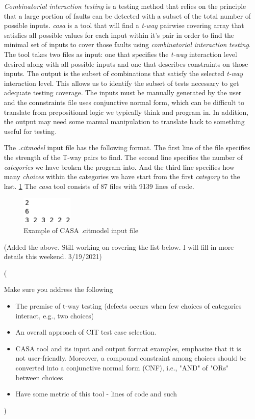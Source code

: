 \documentclass[a4full,12pt]{article}
\newcommand{\eas}[1]{{\color{blue}\sf ({#1})}}
\newcommand{\ag}[1]{{\color{red}\sf ({#1})}}
\begin{document}
\emph{Combinatorial interaction testing} is a testing method that relies on the principle
  that a large portion of faults can be detected with a subset of the total number of 
  possible inputs. \emph{casa} is a tool that will find a \emph{t-way} pairwise covering 
  array that satisfies all possible values for each input within it's pair in order to find
  the minimal set of inputs to cover those faults using \emph{combinatorial interaction
  testing}. The tool takes two files as input: one that specifies the \emph{t-way} interaction
  level desired along with all possible inputs and one that describes constraints on those
  inputs. The output is the subset of combinations that satisfy the selected \emph{t-way}
  interaction level. This allows us to identify the subset of tests necessary to get adequate
  testing coverage. The inputs must be manually generated by the user and the connstraints
  file uses conjunctive normal form, which can be difficult to translate from prepositional
  logic we typically think and program in. In addition, the output may need some manual
  manipulation to translate back to something useful for testing.
  
The \emph{.citmodel} input file has the following format. The first line of the file
  specifies the strength of the T-way pairs to find. The second line specifies the number
  of \emph{categories} we have broken the program into. And the third line specifies how
  many \emph{choices} within the categories we have start from the first \emph{category} to
  the last. \ref{fig:casa_citmodel_input}
The \emph{casa} tool consists of 87 files with 9139 lines of code.
  
\begin{figure}[htb]
\centering
\includegraphics[width=1in,keepaspectratio]{images/casa_citmodel_input.png}
\caption{Example of CASA .citmodel input file}
\label{fig:casa_citmodel_input}
\end{figure}

\ag{Added the above. Still working on covering the list below. I will fill in more details this weekend. 3/19/2021} 
\eas{Make sure you address the following
\begin{itemize}
\item The premise of t-way testing (defects occurs when few choices of categories interact, e.g., two choices)
\item An overall approach of CIT test case selection.
\item CASA tool and its input and output format examples, emphasize that it is not user-friendly. Moreover, a compound constraint among choices should be converted into a conjunctive normal form (CNF), i.e., "AND" of "ORs" between choices
\item Have some metric of this tool - lines of code and such
\end{itemize}
}
\end{document}
